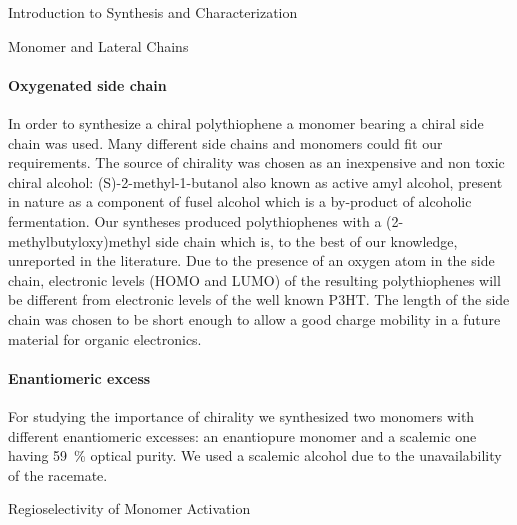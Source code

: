 \begin{section}{Introduction to Synthesis and Characterization}

\begin{subsection}{Monomer and Lateral Chains}

\paragraph{Oxygenated side chain} In order to synthesize a chiral polythiophene a monomer bearing a chiral side chain was used. Many different side chains and monomers could fit our requirements. The source of chirality was chosen as an inexpensive and non toxic chiral alcohol: (S)-2-methyl-1-butanol also known as active amyl alcohol, present in nature as a component of fusel alcohol which is a by-product of alcoholic fermentation. Our syntheses produced polythiophenes with a (2-methyl\-butyl\-oxy)\-methyl side chain which is, to the best of our knowledge, unreported in the literature. 
Due to the presence of an oxygen atom in the side chain, electronic levels (\acrshort{HOMO} and \acrshort{LUMO}) of the resulting polythiophenes will be different from electronic levels of the well known \gls{P3HT}. 
The length of the side chain was chosen to be short enough to allow a good charge mobility in a future material for organic electronics.

\paragraph{Enantiomeric excess} For studying the importance of chirality we synthesized two monomers with different enantiomeric excesses: an enantiopure monomer and a scalemic
one having 59~\% optical purity. We used a scalemic alcohol due to the unavailability of the racemate. 

\end{subsection}
\begin{subsection}{Regioselectivity of Monomer Activation}


\end{subsection}
\end{section}
